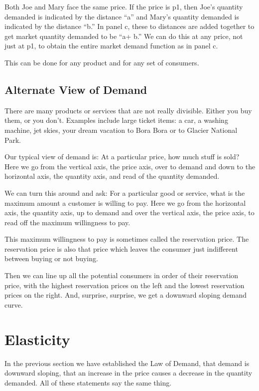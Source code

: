 \documentclass[
]{book}
\begin{document}
Both Joe and Mary face the same price. If the price is p1, then Joe's quantity demanded is indicated by the distance ``a'' and Mary's quantity demanded is indicated by the distance ``b.'' In panel c, these to distances are added together to get market quantity demanded to be ``a+ b.'' We can do this at any price, not just at p1, to obtain the entire market demand function as in panel c.

This can be done for any product and for any set of consumers.

\hypertarget{alternate-view-of-demand}{%
\subsection{Alternate View of Demand}\label{alternate-view-of-demand}}

There are many products or services that are not really divisible. Either you buy them, or you don't. Examples include large ticket items: a car, a washing machine, jet skies, your dream vacation to Bora Bora or to Glacier National Park.

Our typical view of demand is: At a particular price, how much stuff is sold? Here we go from the vertical axis, the price axis, over to demand and down to the horizontal axis, the quantity axis, and read of the quantity demanded.

We can turn this around and ask: For a particular good or service, what is the maximum amount a customer is willing to pay. Here we go from the horizontal axis, the quantity axis, up to demand and over the vertical axis, the price axis, to read off the maximum willingness to pay.

This maximum willingness to pay is sometimes called the reservation price. The reservation price is also that price which leaves the consumer just indifferent between buying or not buying.

Then we can line up all the potential consumers in order of their reservation price, with the highest reservation prices on the left and the lowest reservation prices on the right. And, surprise, surprise, we get a downward sloping demand curve.

\hypertarget{elasticity}{%
\section{Elasticity}\label{elasticity}}

In the previous section we have established the Law of Demand, that demand is downward sloping, that an increase in the price causes a decrease in the quantity demanded. All of these statements say the same thing.
\end{document}
